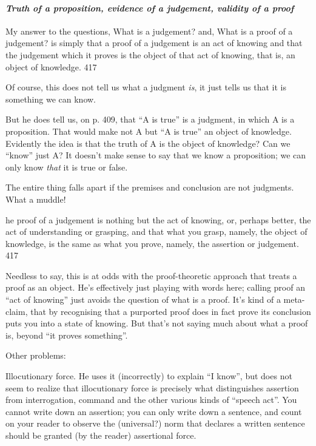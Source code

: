 \documentclass{article}
\begin{document}
\paragraph{\textit{Truth of a proposition, evidence of a judgement, validity of a proof}}

\begin{displayquote}
  My answer to the questions, What is a judgement? and, What is a proof of a judgement? is simply that a proof of a judgement is an act of knowing and that the judgement which it proves is the object of that act of knowing, that is, an object of knowledge.
  \parencite{martin1987truth} 417
\end{displayquote}

Of course, this does not tell us what a judgment \textit{is}, it just
tells us that it is something we can know.

But he does tell us, on p. 409, that ``A is true'' is a judgment, in
which A is a proposition. That would make not A but ``A is true'' an
object of knowledge. Evidently the idea is that the truth of A is the
object of knowledge? Can we ``know'' just A? It doesn't make sense to
say that we know a proposition; we can only know \textit{that} it is
true or false.

The entire thing falls apart if the premises and conclusion are not
judgments. What a muddle!

\begin{displayquote}
  [T]he proof of a judgement is nothing but the act of knowing, or,
  perhaps better, the act of understanding or grasping, and that what
  you grasp, namely, the object of knowledge, is the same as what you
  prove, namely, the assertion or judgement. \parencite{martin1987truth}
  417
\end{displayquote}

Needless to say, this is at odds with the proof-theoretic approach
that treats a proof as an object. He's effectively just playing with
words here; calling proof an ``act of knowing'' just avoids the
question of what is a proof. It's kind of a meta-claim, that by
recognising that a purported proof does in fact prove its conclusion
puts you into a state of knowing. But that's not saying much about
what a proof is, beyond ``it proves something''.

\medskip

Other problems:

Illocutionary force. He uses it (incorrectly) to explain ``I know'',
but does not seem to realize that illocutionary force is precisely
what distinguishes assertion from interrogation, command and the other
various kinds of ``speech act''. You cannot write down an assertion;
you can only write down a sentence, and count on your reader to
observe the (universal?) norm that declares a written sentence should
be granted (by the reader) assertional force.
\end{document}
